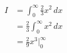 \documentclass{article}
\begin{document}
    \begin{align*}
        I &= \int_{0}^{\infty} \frac{2}{3} x^2 \,dx \\
        &= \frac{2}{3} \int_{0}^{\infty} x^2 \,dx \\
        &= \frac{2}{9} x^3 \Big|_{0}^{\infty} \\
    \end{align*}
\end{document}

